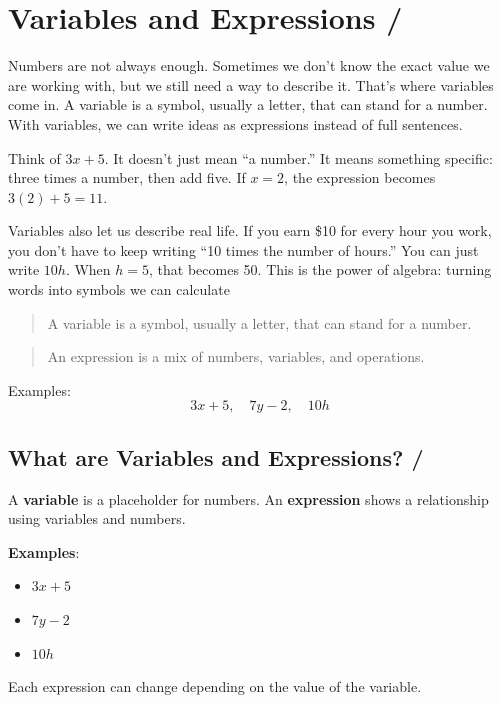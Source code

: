 \newpage
\section{Variables and Expressions / }

Numbers are not always enough. Sometimes we don't know the exact value we are working with, but we still need a way to describe it. That's where variables come in. A variable is a symbol, usually a letter, that can stand for a number. With variables, we can write ideas as expressions instead of full sentences.

Think of \(3x + 5\). It doesn't just mean “a number.” It means something specific: three times a 
number, then add five. If \(x = 2\), the expression becomes \(3(2) + 5 = 11\).

Variables also let us describe real life. If you earn \$10 for every hour you work, you don't have 
to keep writing “10 times the number of hours.” You can just write \(10h\). When \(h = 5\), 
that becomes 50. This is the power of algebra: turning words into symbols we can calculate

\blockquote{A variable is a symbol, usually a letter, that can stand for a number.}

\blockquote{An expression is a mix of numbers, variables, and operations.}

Examples:
\[
3x + 5, \quad 7y - 2, \quad 10h
\]

\subsection{What are Variables and Expressions? / }
A \textbf{variable} is a placeholder for numbers.  
An \textbf{expression} shows a relationship using variables and numbers.

\textbf{Examples}:  
\begin{itemize}
    \item \(3x + 5\)
    \item \(7y - 2\)
    \item \(10h\)
\end{itemize}
Each expression can change depending on the value of the variable.  




















